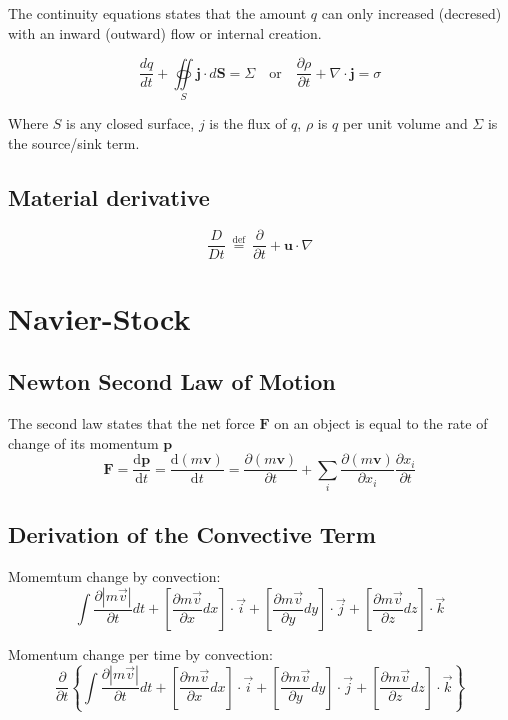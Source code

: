 \documentclass[twocolumn]{article}
\numberwithin{equation}{section}
\begin{document}
The continuity equations states that the amount $q$ can only increased (decresed) with an inward (outward) flow or internal creation.
\begin{framed}
$$\frac{d q}{d t} + \oiint \limits_S\mathbf{j} \cdot d\mathbf{S} = \Sigma \quad  \text{or} \quad \frac{\partial \rho}{\partial t} + \nabla \cdot \mathbf{j} = \sigma$$
\end{framed}
Where $S$ is any closed surface, $j$ is the flux of $q$, $\rho$ is $q$ per unit volume and $\Sigma$ is the source/sink term.


		\subsection{Material derivative}
$$\frac{D}{Dt} \ \stackrel{\mathrm{def}}{=}\  \frac{\partial}{\partial t} + \mathbf{u}\cdot\nabla $$


\newpage
\section{Navier-Stock}
\subsection{Newton Second Law of Motion}
The second law states that the net force $\mathbf{F}$ on an object is equal to the rate of change of its momentum $\mathbf{p}$
$$ \mathbf{F} = \frac{\mathrm{d}\mathbf{p}}{\mathrm{d}t} = \frac{\mathrm{d}(m\mathbf v)}{\mathrm{d}t} = \frac{{\partial \left( {m\mathbf v } \right)}}{{\partial t}} +  \sum_i\frac{{\partial \left( {m\mathbf v } \right)}}{{\partial x_i}}\frac{{\partial x_i}}{{\partial t}} $$

\subsection{Derivation of the Convective Term}

Momemtum change by convection: 
\[\int {\frac{{\partial \left| {m\overrightarrow v } \right|}}{{\partial t}}} dt + \left[ {\frac{{\partial m\overrightarrow v }}{{\partial x}}dx} \right] \cdot \overrightarrow i  + \left[ {\frac{{\partial m\overrightarrow v }}{{\partial y}}dy} \right] \cdot \overrightarrow j  + \left[ {\frac{{\partial m\overrightarrow v }}{{\partial z}}dz} \right] \cdot \overrightarrow k \]

Momentum change per time by convection:
\[\frac{\partial }{{\partial t}}\left\{ {\int {\frac{{\partial \left| {m\overrightarrow v } \right|}}{{\partial t}}} dt + \left[ {\frac{{\partial m\overrightarrow v }}{{\partial x}}dx} \right] \cdot \overrightarrow i  + \left[ {\frac{{\partial m\overrightarrow v }}{{\partial y}}dy} \right] \cdot \overrightarrow j  + \left[ {\frac{{\partial m\overrightarrow v }}{{\partial z}}dz} \right] \cdot \overrightarrow k } \right\}\]
\end{document}
